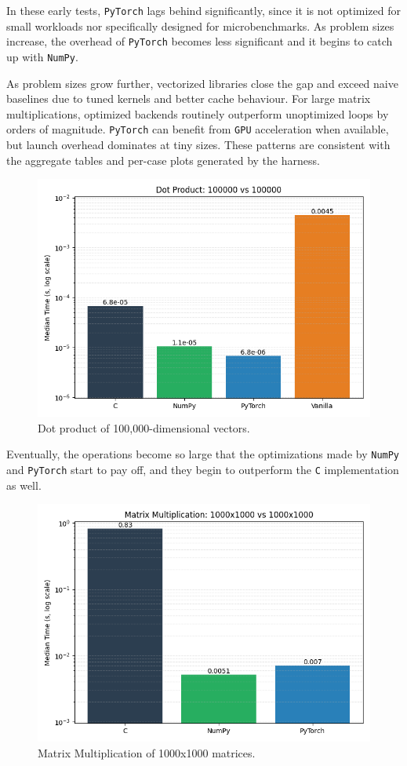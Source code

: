 \documentclass[a4paper,12pt]{article}
\begin{document}
In these early tests, \texttt{PyTorch} lags behind significantly, since it is not optimized for small workloads nor specifically designed for microbenchmarks. As problem sizes increase, the overhead of \texttt{PyTorch} becomes less significant and it begins to catch up with \texttt{NumPy}.

As problem sizes grow further, vectorized libraries close the gap and exceed naive baselines due to tuned kernels and better cache behaviour. For large matrix multiplications, optimized backends routinely outperform unoptimized loops by orders of magnitude. \texttt{PyTorch} can benefit from \texttt{GPU} acceleration when available, but launch overhead dominates at tiny sizes. These patterns are consistent with the aggregate tables and per-case plots generated by the harness.

\begin{figure}[H]
  \centering
  \includegraphics[width=0.6\linewidth]{results/bar/DOT_100000_100000.png}
  \caption{Dot product of 100{,}000-dimensional vectors.}
  \label{fig:three}
\end{figure}

Eventually, the operations become so large that the optimizations made by \texttt{NumPy} and \texttt{PyTorch} start to pay off, and they begin to outperform the \texttt{C} implementation as well.

\begin{figure}[H]
  \centering
  \includegraphics[width=0.7\linewidth]{results/bar/MM_1000x1000_1000x1000.png}
  \caption{Matrix Multiplication of 1000x1000 matrices.}
  \label{fig:four}
\end{figure}
\end{document}
